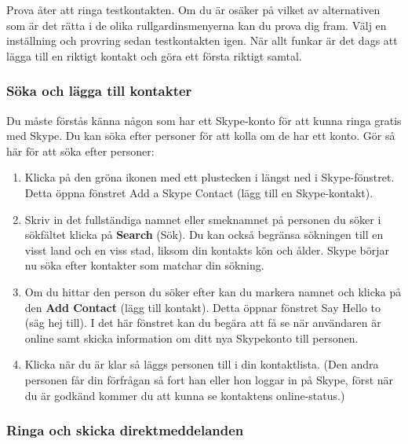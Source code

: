 \documentclass[a4paper,final]{memoir} %
\begin{document}
\xnegskip{}


Prova åter att ringa testkontakten. Om du är osäker på vilket av alternativen som är det rätta i de olika rullgardinsmenyerna kan du prova dig fram. Välj en inställning och provring sedan testkontakten igen. När allt funkar är det dags att lägga till en riktigt kontakt och göra ett första riktigt samtal.

\subsubsection{Söka och lägga till kontakter}

Du måste förstås känna någon som har ett Skype-konto för att kunna ringa gratis med Skype. Du kan söka efter personer för att kolla om de har ett konto. Gör så här för att söka efter personer:

\begin{enumerate}

\item Klicka på den gröna ikonen med ett plustecken i längst ned i Skype-fönstret. Detta öppna fönstret Add a Skype Contact (lägg till en Skype-kontakt). 
\item Skriv in det fullständiga namnet eller smeknamnet på personen du söker i sökfältet  klicka på \textbf{Search} (Sök). Du kan också begränsa sökningen till en visst land och en viss stad, liksom din kontakts kön och ålder. Skype börjar nu söka efter kontakter som matchar din sökning.
\item Om du hittar den person du söker efter kan du markera namnet och klicka på den \textbf{Add Contact} (lägg till kontakt). Detta öppnar fönstret Say Hello to (säg hej till). I det här fönstret kan du begära att få se när användaren är online samt skicka information om ditt nya Skypekonto till personen. 
\item Klicka \xok{} när du är klar så läggs personen till i din kontaktlista. (Den andra personen får din förfrågan så fort han eller hon loggar in på Skype, först när du är godkänd kommer du att kunna se kontaktens online-status.)

\end{enumerate}


\subsubsection{Ringa och skicka direktmeddelanden}
\end{document}
